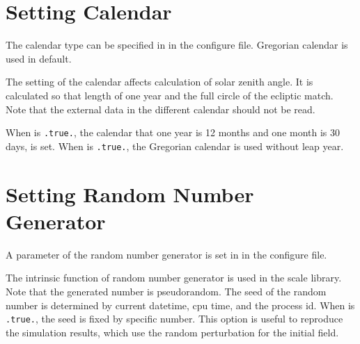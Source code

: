 \section{Setting Calendar} \label{subsec:calendar}

The calendar type can be specified in  in the configure file.
Gregorian calendar is used in default.


\noindent
The setting of the calendar affects calculation of solar zenith angle.
It is calculated so that length of one year and the full circle of the ecliptic match.
Note that the external data in the different calendar should not be read.

When  is \verb|.true.|,
the calendar that one year is 12 months and one month is 30 days, is set.
%
When  is \verb|.true.|,
the Gregorian calendar is used without leap year.



\section{Setting Random Number Generator} \label{subsec:random}

A parameter of the random number generator is set in  in the configure file.


\noindent
The intrinsic function of random number generator is used in the scale library. Note that the generated number is pseudorandom.
The seed of the random number is determined by current datetime, cpu time, and the process id.
%
When  is \verb|.true.|, the seed is fixed by specific number.
This option is useful to reproduce the simulation results, which use the random perturbation for the initial field.



